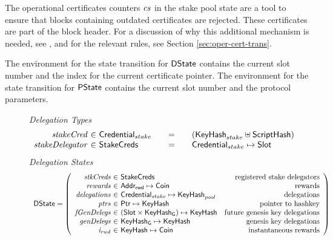 The operational certificates counters $\mathit{cs}$ in the stake pool state are a
tool to ensure that blocks containing outdated certificates are rejected.
These certificates are part of the block header.
For a discussion of why this additional mechanism is needed,
see \cite{delegation_design}, and for
the relevant rules, see Section \ref{sec:oper-cert-trans}.

The environment for the state transition for $\mathsf{DState}$ contains the current slot number
and the index for the current certificate pointer.
The environment for the state transition for $\mathsf{PState}$ contains the current slot number
and the protocol parameters.

\begin{figure}
  \emph{Delegation Types}
  \begin{equation*}
    \begin{array}{r@{~\in~}l@{\qquad=\qquad}lr}
      \var{stakeCred} & \StakeCredential & (\KeyHash_{stake} \uniondistinct
                                       \HashScr) \\
      \var{stakeDelegator} & \StakeCreds & \StakeCredential \mapsto \Slot \\
    \end{array}
  \end{equation*}
  \emph{Delegation States}
  \begin{equation*}
    \begin{array}{l}
    \DState =
    \left(\begin{array}{r@{~\in~}lr}
            \var{stkCreds} & \StakeCreds & \text{registered stake delegators}\\
            \var{rewards} & \AddrRWD \mapsto \Coin & \text{rewards}\\
            \var{delegations} & \StakeCredential \mapsto \KeyHash_{pool} & \text{delegations}\\
            \var{ptrs} & \Ptr \mapsto \KeyHash & \text{pointer to hashkey}\\
            \var{fGenDelegs} & (\Slot\times\KeyHashGen) \mapsto \KeyHash & \text{future genesis key delegations}\\
            \var{genDelegs} & \KeyHashGen \mapsto \KeyHash & \text{genesis key delegations}\\
            \var{i_{rwd}} & \KeyHash \mapsto \Coin & \text{instantaneous rewards}\\
          \end{array}
      \right)
      \\

\end{array}
\end{equation*}
\end{figure}
